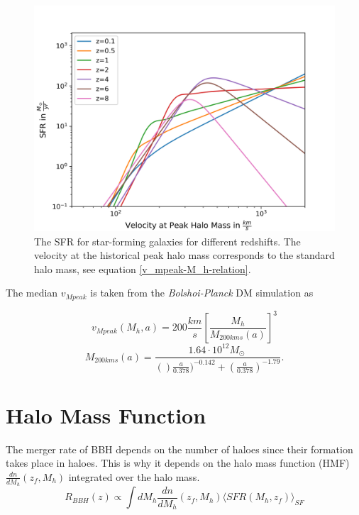\begin{figure}
    \centering
    \includegraphics[width=1\linewidth]{Images/sfr_of_v.png}
    \caption[The SFR for star-forming galaxies for different redshifts.]{The SFR for star-forming galaxies for different redshifts. The velocity at the historical peak halo mass corresponds to the standard halo mass, see equation \ref{v_mpeak-M_h-relation}.}
    \label{SFR_of_v}
\end{figure} 


The median $v_{Mpeak}$ is taken from the \textit{Bolshoi-Planck} DM simulation as

\begin{equation}
    v_{Mpeak}(M_h, a) = 200 \frac{km}{s}\left[ \frac{M_h}{M_{200kms}(a)}\right]^3
    \label{v_mpeak-M_h-relation}
\end{equation}
\begin{equation}
    M_{200kms}(a) = \frac{1.64 \cdot 10^{12} M_\odot\ }{()\frac{a}{0.378})^{-0.142}+(\frac{a}{0.378})^{-1.79}} .
\end{equation}

\section{Halo Mass Function}

The merger rate of BBH depends on the number of haloes since their formation takes place in haloes. This is why it depends on the halo mass function (HMF) $\frac{dn}{dM_h}(z_f, M_h)$ integrated over the halo mass. 
\begin{equation}
    R_{BBH}(z) \propto \int dM_h \frac{dn}{dM_h}(z_f, M_h)\langle SFR(M_h, z_f)\rangle_{SF}
\end{equation}

